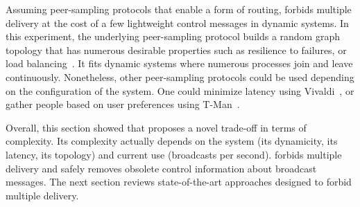 

\noindent Assuming peer-sampling protocols that enable a form of routing,
\RPCBROADCAST forbids multiple delivery at the cost of a few lightweight control
messages in dynamic systems. In this experiment, the underlying peer-sampling
protocol builds a random graph topology that has numerous desirable properties
such as resilience to failures, or load balancing~\cite{jelasity2007gossip}. It
fits dynamic systems where numerous processes join and leave
continuously. Nonetheless, other peer-sampling protocols could be used depending
on the configuration of the system. One could minimize latency using
Vivaldi~\cite{dabek2004vivaldi}, or gather people based on user preferences
using T-Man~\cite{jelasity2009tman}.




Overall, this section showed that \RPCBROADCAST proposes a novel trade-off in
terms of complexity. Its complexity actually depends on the system (its
dynamicity, its latency, its topology) and current use (broadcasts per second).
\RPCBROADCAST forbids multiple delivery and safely removes obsolete control
information about broadcast messages. The next section reviews state-of-the-art
approaches designed to forbid multiple delivery.




